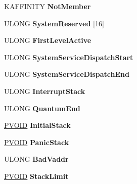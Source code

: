 \begin{DoxyCompactItemize}
\begin{tabbing}
\end{tabbing}\item 
\mbox{\label{struct___k_i_p_c_r_abe618a3fdfbd19261c5036bd912ab3b1}} 
K\+A\+F\+F\+I\+N\+I\+TY {\bfseries Not\+Member}
\item 
\mbox{\label{struct___k_i_p_c_r_a2507075a0a8165cfd4a649d4e30fb2f8}} 
U\+L\+O\+NG {\bfseries System\+Reserved} \mbox{[}16\mbox{]}
\item 
\mbox{\label{struct___k_i_p_c_r_aa43bacbb129d16d9f75f9e0934571882}} 
U\+L\+O\+NG {\bfseries First\+Level\+Active}
\item 
\mbox{\label{struct___k_i_p_c_r_ad73de65f1096271107540d885ef31777}} 
U\+L\+O\+NG {\bfseries System\+Service\+Dispatch\+Start}
\item 
\mbox{\label{struct___k_i_p_c_r_a2b0d2bca3fd31d540b938fb23dee0399}} 
U\+L\+O\+NG {\bfseries System\+Service\+Dispatch\+End}
\item 
\mbox{\label{struct___k_i_p_c_r_a4fb509f57e0ec7b51dd394960662e92c}} 
U\+L\+O\+NG {\bfseries Interrupt\+Stack}
\item 
\mbox{\label{struct___k_i_p_c_r_a30f98c93411fb5e6c3323e42ef982064}} 
U\+L\+O\+NG {\bfseries Quantum\+End}
\item 
\mbox{\label{struct___k_i_p_c_r_ae404e8b87edcea3ba2a58b51d3469b43}} 
\hyperlink{interfacevoid}{P\+V\+O\+ID} {\bfseries Initial\+Stack}
\item 
\mbox{\label{struct___k_i_p_c_r_a9c9e12ecdfb96a8a58ef3a68126e9561}} 
\hyperlink{interfacevoid}{P\+V\+O\+ID} {\bfseries Panic\+Stack}
\item 
\mbox{\label{struct___k_i_p_c_r_a6998b44fda8d44b253305dadca571fb8}} 
U\+L\+O\+NG {\bfseries Bad\+Vaddr}
\item 
\mbox{\label{struct___k_i_p_c_r_a9356bf681df09a95f9e1a905f199eb53}} 
\hyperlink{interfacevoid}{P\+V\+O\+ID} {\bfseries Stack\+Limit}

\end{DoxyCompactItemize}
